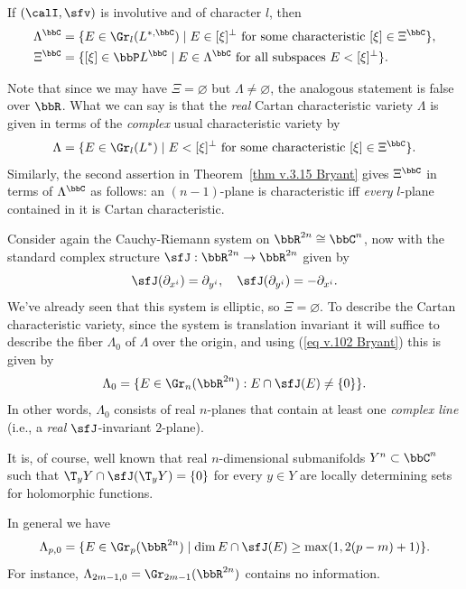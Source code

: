 \begin{thm}\label{thm v.3.15 Bryant}
    If $(\calI,\sfv)$ is involutive and of character $l$, then 
    \begin{align}
        \Lambda^\bbC&=\{E\in \Gr_l(L^{\ast,\bbC})\mid E\in [\xi]^\perp \text{ for some characteristic }[\xi]\in\Xi^\bbC\},\\
        \Xi^\bbC&=\{[\xi]\in\bbP L^\bbC\mid E\in \Lambda^\bbC \text{ for all subspaces }E<[\xi]^\perp\}.
    \end{align}
\end{thm}

Note that since we may have $\Xi=\varnothing$ but $\Lambda\neq \varnothing$, the analogous statement is false over $\bbR$. What we can say is that the \emph{real} Cartan characteristic variety $\Lambda$ is given in terms of the \emph{complex} usual characteristic variety by 
\[\Lambda=\{E\in\Gr_l(L^\ast)\mid E<[\xi]^\perp \text{ for some characteristic }[\xi]\in\Xi^\bbC\}.\label{eq v.102 Bryant}\]
Similarly, the second assertion in Theorem~\ref{thm v.3.15 Bryant} gives $\Xi^\bbC$ in terms of $\Lambda^\bbC$ as follows: an $(n-1)$-plane is characteristic iff \emph{every} $l$-plane contained in it is Cartan characteristic.

\begin{example}
    Consider again the Cauchy-Riemann system on $\bbR^{2n}\cong \bbC^n$, now with the standard complex structure $\sfJ:\bbR^{2n}\to \bbR^{2n}$ given by 
    \[\sfJ(\partial_{x^i})=\partial_{y^i},\quad \sfJ(\partial_{y^i})=-\partial_{x^i}.\]
    We've already seen that this system is elliptic, so $\Xi=\varnothing$. To describe the Cartan characteristic variety, since the system is translation invariant it will suffice to describe the fiber $\Lambda_0$ of $\Lambda$ over the origin, and using (\ref{eq v.102 Bryant}) this is given by 
    \[\Lambda_0=\{E\in\Gr_n(\bbR^{2n}):E\cap \sfJ(E)\neq \{0\}\}.\]
    In other words, $\Lambda_0$ consists of real $n$-planes that contain at least one \emph{complex line} (i.e., a \emph{real} $\sfJ$-invariant $2$-plane). 

    It is, of course, well known that real $n$-dimensional submanifolds $Y^n\subset \bbC^n$ such that $\T_y Y\cap \sfJ(\T_y Y)=\{0\}$ for every $y\in Y$ are locally determining sets for holomorphic functions. 

    In general we have 
    \[\Lambda_{p,0}=\{E\in\Gr_p(\bbR^{2n})\mid \dim E\cap \sfJ(E)\geq \max(1,2(p-m)+1)\}.\]
    For instance, $\Lambda_{2m-1,0}=\Gr_{2m-1}(\bbR^{2n})$ contains no information.
\end{example}

